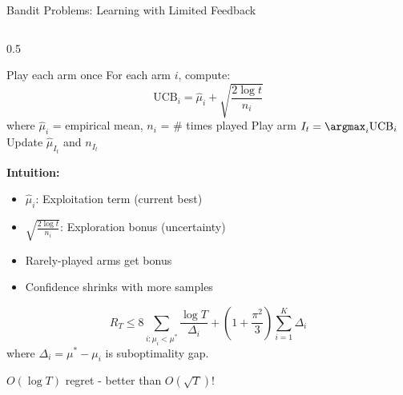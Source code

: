 \begin{frame}{Bandit Problems: Learning with Limited Feedback}
\begin{columns}
\begin{column}{0.5\textwidth}
\begin{algorithm}[H]
\caption{UCB Algorithm}
\begin{algorithmic}[1]
\STATE Play each arm once
\STATE For each arm $i$, compute:
\[\text{UCB}_i = \hat{\mu}_i + \sqrt{\frac{2\log t}{n_i}}\]
where $\hat{\mu}_i$ = empirical mean, $n_i$ = \# times played
\STATE Play arm $I_t = \argmax_i \text{UCB}_i$
\STATE Update $\hat{\mu}_{I_t}$ and $n_{I_t}$
\ENDFOR
\end{algorithmic}
\end{algorithm}

\textbf{Intuition:}
\begin{itemize}
\item $\hat{\mu}_i$: Exploitation term (current best)
\item $\sqrt{\frac{2\log t}{n_i}}$: Exploration bonus (uncertainty)
\item Rarely-played arms get bonus
\item Confidence shrinks with more samples
\end{itemize}

\begin{theorem}
\[R_T \leq 8\sum_{i: \mu_i < \mu^*} \frac{\log T}{\Delta_i} + \left(1 + \frac{\pi^2}{3}\right)\sum_{i=1}^K \Delta_i\]
where $\Delta_i = \mu^* - \mu_i$ is suboptimality gap.
\end{theorem}

$O(\log T)$ regret - better than $O(\sqrt{T})$!
\end{column}
\end{columns}
\end{frame}

